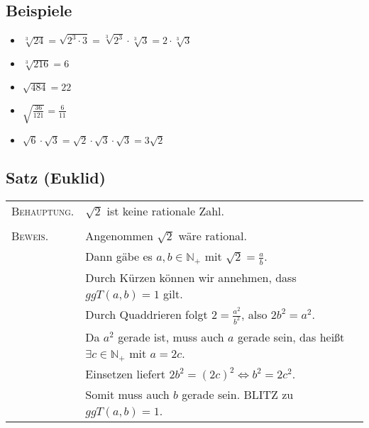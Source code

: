 	
\subsection{Beispiele}

	\begin{itemize}
	\item $\sqrt[3]{24}=\sqrt{2^3\cdot 3}=\sqrt[3]{2^3}\cdot \sqrt[3]{3}=2\cdot \sqrt[3]{3}$
	\item $\sqrt[3]{216}=6$	
	\item $\sqrt{484}=22$
	\item $\sqrt{\frac{36}{121}}=\frac{6}{11}$
	\item $\sqrt{6}\cdot \sqrt{3}= \sqrt{2}\cdot\sqrt{3}\cdot\sqrt{3}=3\sqrt{2}$	
	
	\end{itemize}
	
	
\subsection[Irrationalitätsbeweis von $\sqrt{2}$ nach Euklid]{Satz (Euklid)}
	\begin{tabular}{ll}
	
	
	\textsc{Behauptung.} 	& $\sqrt{2}$ ist keine rationale Zahl.\\
							&									\\
	\textsc{Beweis.} 		& Angenommen $\sqrt{2}$ wäre rational.\\
							& Dann gäbe es $a,b \in \mathbb{N_+}$ mit $\sqrt{2}=\frac{a}{b}$. \\
							& Durch Kürzen können wir annehmen, dass $ggT(a,b)=1$ gilt. \\
							& Durch Quaddrieren folgt $2= \frac{a^2}{b^2}$, also $2b^2=a^2$. \\
							& Da $a^2$ gerade ist, muss auch $a$ gerade sein, 
							das heißt $\exists c \in \mathbb{N_+}$ mit $a=2c$. \\
							& Einsetzen liefert $2b^2=(2c)^2 \Leftrightarrow b^2=2c^2$. \\
							& Somit muss auch $b$ gerade sein. BLITZ zu $ggT(a,b)=1$.
	\end{tabular}